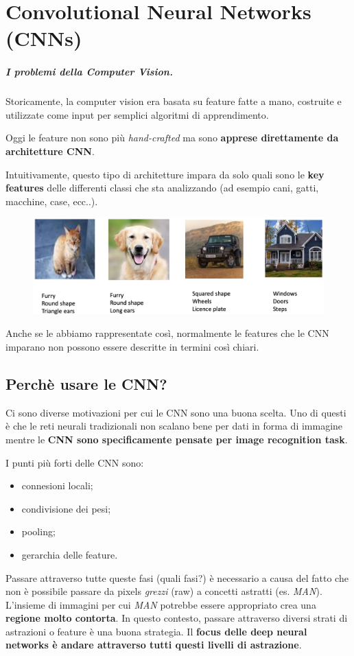 \chapter{Convolutional Neural Networks (CNNs)}
\paragraph{I problemi della Computer Vision.} Storicamente, la computer vision era basata su feature fatte a mano, costruite e utilizzate come input per semplici algoritmi di apprendimento.


Oggi le feature non sono più \textit{hand-crafted} ma sono \textbf{apprese direttamente da architetture CNN}.


Intuitivamente, questo tipo di architetture impara da solo quali sono le \textbf{key features} delle differenti classi che sta analizzando (ad esempio cani, gatti, macchine, case, ecc..).
\begin{figure}[!h]
    \includegraphics[scale=.5]{images/cnn/cv_problems.png}
    \centering
\end{figure}



Anche se le abbiamo rappresentate così, normalmente le features che le CNN imparano non possono essere descritte in termini così chiari.

\section{Perchè usare le CNN?}
Ci sono diverse motivazioni per cui le CNN sono una buona scelta. Uno di questi è che le reti neurali tradizionali non scalano bene per dati in forma di immagine mentre le \textbf{CNN sono specificamente pensate per image recognition task}.


I punti più forti delle CNN sono:
\begin{itemize}
    \item connesioni locali;
    \item condivisione dei pesi;
    \item pooling;
    \item gerarchia delle feature.
\end{itemize}
Passare attraverso tutte queste fasi (quali fasi?) è necessario a causa del fatto che non è possibile passare da pixels \textit{grezzi} (raw) a concetti astratti (es. \textit{MAN}). L'insieme di immagini per cui \textit{MAN} potrebbe essere appropriato crea una \textbf{regione molto contorta}. In questo contesto, passare attraverso diversi strati di astrazioni o feature è una buona strategia. Il \textbf{focus delle deep neural networks è andare attraverso tutti questi livelli di astrazione}.
